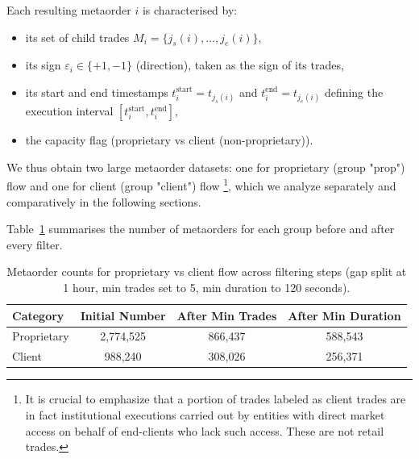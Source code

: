 \documentclass[11pt]{article}
\begin{document}
Each resulting metaorder $i$ is characterised by:

\begin{itemize}
  \item its set of child trades $M_i = \{j_s(i),\dots,j_e(i)\}$,
  \item its sign $\varepsilon_i \in \{+1,-1\}$ (direction), taken as the sign of
        its trades,
  \item its start and end timestamps $t_i^{\text{start}} = t_{j_s(i)}$
        and $t_i^{\text{end}} = t_{j_e(i)}$ defining the execution interval $[t_i^{\text{start}},t_i^{\text{end}}]$,
  \item the capacity flag (proprietary vs client (non-proprietary)).
\end{itemize}

We thus obtain two large metaorder datasets: one for proprietary (group "prop") flow and one for client (group "client") flow
 \footnote{It is crucial to emphasize that a portion of 
  trades labeled as client trades are in fact institutional executions carried out by entities with direct market access 
  on behalf of end-clients who lack such access. These are not retail trades.}, which we analyze 
separately and comparatively in the following sections.


Table~\ref{tab:metaorders_numbers} summarises the number of metaorders for each group before and after every filter.

\begin{table}[h!]
\centering
\begin{tabular}{lccc}
\hline
\textbf{Category} & \textbf{Initial Number} & \textbf{After Min Trades} & \textbf{After Min Duration} \\
\hline
Proprietary & 2,774,525 & 866,437 & 588,543 \\
Client      & 988,240  & 308,026 & 256,371 \\
\hline
\end{tabular}
\caption{Metaorder counts for proprietary vs client flow across filtering steps (gap split at 1 hour, min trades set to 5, min duration to 120 seconds).}
\label{tab:metaorders_numbers}
\end{table}
\end{document}
